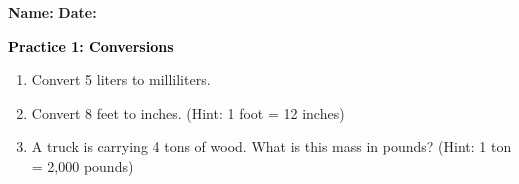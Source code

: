 \documentclass[12pt, letterpaper, fleqn]{article}
\begin{document}
\textbf{Name:} \underline{\hspace{5cm}}
\hfill
\textbf{Date:} \underline{\hspace{3cm}}\\

\begin{tcolorbox}[colback=customteal!20]
    \large\textcolor{black}{\textbf{Practice 1: Conversions}}
\end{tcolorbox}
\begin{enumerate}[itemsep=3.5cm, leftmargin=0.6cm]
\item Convert 5 liters to milliliters.
\vspace{3.5cm}
\item Convert 8 feet to inches. (Hint: 1 foot = 12 inches)
\vspace{3.5cm}
\item A truck is carrying 4 tons of wood. What is this mass in pounds? (Hint: 1 ton = 2,000 pounds)
\end{enumerate}
\end{document}
